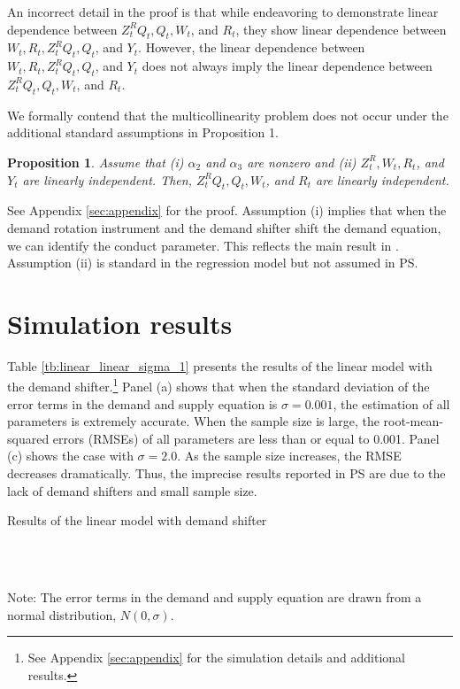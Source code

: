 \documentclass[11pt, a4paper]{article}
\newtheorem{proposition}{Proposition}
\begin{document}
An incorrect detail in the proof is that while endeavoring to demonstrate linear dependence between $Z^{R}_{t}Q_{t}, Q_{t}, W_{t}$, and $R_{t}$, they show linear dependence between $W_{t}, R_{t}, Z^{R}_{t}Q_{t}, Q_{t}$, and $Y_t$. 
However, the linear dependence between $W_{t}, R_{t}, Z^{R}_{t}Q_{t}, Q_{t}$, and $Y_t$ does not always imply the linear dependence between $Z^{R}_{t}Q_{t}, Q_{t}, W_{t}$, and $R_{t}$.

We formally contend that the multicollinearity problem does not occur under the additional standard assumptions in Proposition 1.
\begin{proposition}
    Assume that (i) $\alpha_2$ and $\alpha_3$ are nonzero and (ii) $Z^R_t, W_t, R_t$, and $Y_t$ are linearly independent.
    Then, $Z^{R}_{t}Q_{t}, Q_{t}, W_{t}$, and $R_{t}$ are linearly independent.
\end{proposition}

See Appendix \ref{sec:appendix} for the proof.
Assumption (i) implies that when the demand rotation instrument and the demand shifter shift the demand equation, we can identify the conduct parameter.
This reflects the main result in \citet{bresnahan1982oligopoly}.
Assumption (ii) is standard in the regression model but not assumed in PS.


\section{Simulation results}\label{sec:results}

Table \ref{tb:linear_linear_sigma_1} presents the results of the linear model with the demand shifter.\footnote{See Appendix \ref{sec:appendix} for the simulation details and additional results.}
Panel (a) shows that when the standard deviation of the error terms in the demand and supply equation is $\sigma = 0.001$, the estimation of all parameters is extremely accurate.
When the sample size is large, the root-mean-squared errors (RMSEs) of all parameters are less than or equal to 0.001. 
Panel (c) shows the case with $\sigma = 2.0$. 
As the sample size increases, the RMSE decreases dramatically. 
Thus, the imprecise results reported in PS are due to the lack of demand shifters and small sample size.



\begin{table}[!htbp]
  \begin{center}
      \caption{Results of the linear model with demand shifter}
      \label{tb:linear_linear_sigma_1} 
      \subfloat[$\sigma=0.001$]{}\\
      \subfloat[$\sigma=0.5$]{}\\
    \subfloat[$\sigma=2.0$]{}
  \end{center}
  \footnotesize
  Note: The error terms in the demand and supply equation are drawn from a normal distribution, $N(0,\sigma)$.
\end{table} 
\end{document}
